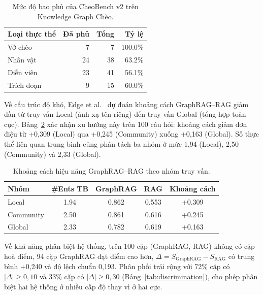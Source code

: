 \begin{table}[h]
\centering
\caption{Mức độ bao phủ của CheoBench v2 trên Knowledge Graph Chèo.}
\label{tab:coverage_entity}
\begin{tabular}{lrrr}
\hline
\textbf{Loại thực thể} & \textbf{Đã phủ} & \textbf{Tổng} & \textbf{Tỷ lệ} \\
\hline
Vở chèo       &  7 &  7 & 100.0\% \\
Nhân vật      & 24 & 38 &  63.2\% \\
Diễn viên     & 23 & 41 &  56.1\% \\
Trích đoạn    &  9 & 15 &  60.0\% \\
\hline
\end{tabular}
\end{table}

Về cấu trúc độ khó, Edge et al.~\cite{edge2024graphrag} dự đoán khoảng cách GraphRAG--RAG giảm dần từ truy vấn Local (ánh xạ tên riêng) đến truy vấn Global (tổng hợp toàn cục). Bảng~\ref{tab:construct_validity} xác nhận xu hướng này trên 100 câu hỏi: khoảng cách giảm đơn điệu từ +0,309 (Local) qua +0,245 (Community) xuống +0,163 (Global). Số thực thể liên quan trung bình cũng phân tách ba nhóm ở mức 1,94 (Local), 2,50 (Community) và 2,33 (Global).

\begin{table}[h]
\centering
\caption{Khoảng cách hiệu năng GraphRAG--RAG theo nhóm truy vấn.}
\label{tab:construct_validity}
\begin{tabular}{lcccc}
\hline
\textbf{Nhóm} & \textbf{\#Ents TB} & \textbf{GraphRAG} & \textbf{RAG} & \textbf{Khoảng cách} \\
\hline
Local      & 1.94 & 0.862 & 0.553 & +0.309 \\
Community  & 2.50 & 0.861 & 0.616 & +0.245 \\
Global     & 2.33 & 0.782 & 0.619 & +0.163 \\
\hline
\end{tabular}
\end{table}

Về khả năng phân biệt hệ thống, trên 100 cặp (GraphRAG, RAG) không có cặp hoà điểm, 94 cặp GraphRAG đạt điểm cao hơn, $\Delta = S_{\text{GraphRAG}} - S_{\text{RAG}}$ có trung bình +0,240 và độ lệch chuẩn 0,193. Phân phối trải rộng với 72\% cặp có $|\Delta| \geq 0{,}10$ và 33\% cặp có $|\Delta| \geq 0{,}30$ (Bảng~\ref{tab:discrimination}), cho phép phân biệt hai hệ thống ở nhiều cấp độ thay vì ở hai cực.

